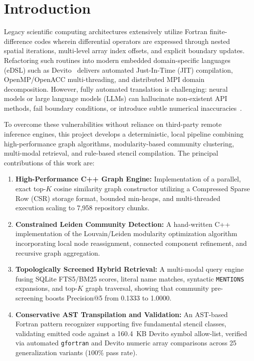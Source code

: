 \documentclass[conference]{IEEEtran}
\begin{document}
\section{Introduction}
Legacy scientific computing architectures extensively utilize Fortran finite-difference codes wherein differential operators are expressed through nested spatial iterations, multi-level array index offsets, and explicit boundary updates. Refactoring such routines into modern embedded domain-specific languages (eDSL) such as Devito~\cite{louboutin2019devito} delivers automated Just-In-Time (JIT) compilation, OpenMP/OpenACC multi-threading, and distributed MPI domain decomposition. However, fully automated translation is challenging: neural models or large language models (LLMs) can hallucinate non-existent API methods, fail boundary conditions, or introduce subtle numerical inaccuracies~\cite{hou2026agent}.

To overcome these vulnerabilities without reliance on third-party remote inference engines, this project develops a deterministic, local pipeline combining high-performance graph algorithms, modularity-based community clustering, multi-modal retrieval, and rule-based stencil compilation. The principal contributions of this work are:
\begin{enumerate}[label=\textbf{C\arabic*.}]
    \item \textbf{High-Performance C++ Graph Engine:} Implementation of a parallel, exact top-$K$ cosine similarity graph constructor utilizing a Compressed Sparse Row (CSR) storage format, bounded min-heaps, and multi-threaded execution scaling to 7,958 repository chunks.
    \item \textbf{Constrained Leiden Community Detection:} A hand-written C++ implementation of the Louvain/Leiden modularity optimization algorithm incorporating local node reassignment, connected component refinement, and recursive graph aggregation.
    \item \textbf{Topologically Screened Hybrid Retrieval:} A multi-modal query engine fusing SQLite FTS5/BM25 scores, literal name matches, syntactic \texttt{MENTIONS} expansions, and top-$K$ graph traversal, showing that community pre-screening boosts Precision@5 from 0.1333 to 1.0000.
    \item \textbf{Conservative AST Transpilation and Validation:} An AST-based Fortran pattern recognizer supporting five fundamental stencil classes, validating emitted code against a 160.4~KB Devito symbol allow-list, verified via automated \texttt{gfortran} and Devito numeric array comparisons across 25 generalization variants ($100\%$ pass rate).
\end{enumerate}
\end{document}
